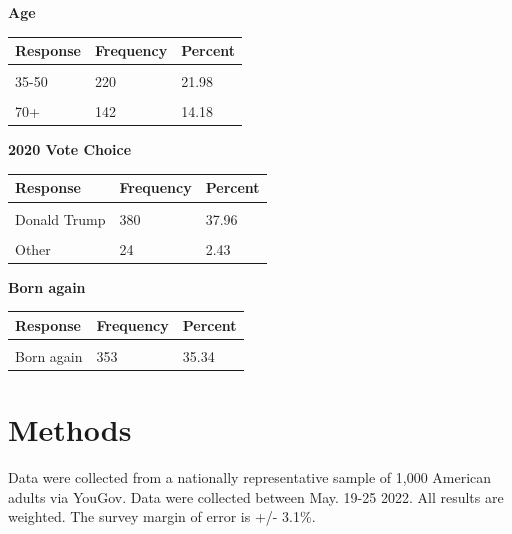 \documentclass[]{article}
\begin{document}
\textbf{ Age }

\begin{tabu} to 
\toprule
Response & Frequency & Percent\\
\midrule
{} &  & \\
35-50 & 220 & 21.98\\
 &  & \\
70+ & 142 & 14.18\\
\bottomrule
\end{tabu}

\textbf{ 2020 Vote Choice }

\begin{tabu} to 
\toprule
Response & Frequency & Percent\\
\midrule
{} &  & \\
Donald Trump & 380 & 37.96\\
 &  & \\
Other & 24 & 2.43\\
\bottomrule
\end{tabu}

\textbf{ Born again }

\begin{tabu} to 
\toprule
Response & Frequency & Percent\\
\midrule
{} &  & \\
Born again & 353 & 35.34\\
\bottomrule
\end{tabu}

\newpage

\hypertarget{methods}{%
\section{Methods}\label{methods}}

Data were collected from a nationally representative sample of 1,000
American adults via YouGov. Data were collected between May. 19-25 2022.
All results are weighted. The survey margin of error is +/- 3.1\%.
\end{document}

